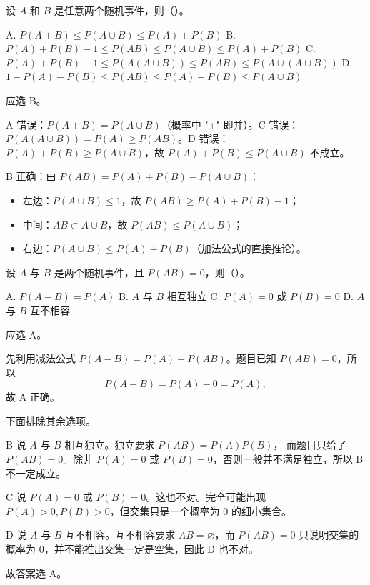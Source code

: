 ﻿\documentclass[lang=cn,11pt]{elegantbook}
\begin{document}
\begin{exercise}\label{exer:1-47}
设 \(A\) 和 \(B\) 是任意两个随机事件，则（\quad）。\par
A. \(P(A+B)\le P(A\cup B)\le P(A)+P(B)\)\quad
B. \(P(A)+P(B)-1\le P(AB)\le P(A\cup B)\le P(A)+P(B)\)\quad
C. \(P(A)+P(B)-1\le P(A(A\cup B))\le P(AB)\le P(A\cup(A\cup B))\)\quad
D. \(1-P(A)-P(B)\le P(AB)\le P(A)+P(B)\le P(A\cup B)\)
\end{exercise}

\begin{solution}
应选 B。

A 错误：\(P(A+B)=P(A\cup B)\)（概率中 "+" 即并）。C 错误：\(P(A(A\cup B))=P(A)\ge P(AB)\)。D 错误：\(P(A)+P(B)\ge P(A\cup B)\)，故 \(P(A)+P(B)\le P(A\cup B)\) 不成立。

B 正确：由 \(P(AB)=P(A)+P(B)-P(A\cup B)\)：
\begin{itemize}
    \item 左边：\(P(A\cup B)\le 1\)，故 \(P(AB)\ge P(A)+P(B)-1\)；
    \item 中间：\(AB\subset A\cup B\)，故 \(P(AB)\le P(A\cup B)\)；
    \item 右边：\(P(A\cup B)\le P(A)+P(B)\)（加法公式的直接推论）。
\end{itemize}
\end{solution}

\begin{exercise}\label{exer:1-48}
设 \(A\) 与 \(B\) 是两个随机事件，且 \(P(AB)=0\)，则（\quad）。\par
A. \(P(A-B)=P(A)\)\quad
B. \(A\) 与 \(B\) 相互独立\quad
C. \(P(A)=0\) 或 \(P(B)=0\)\quad
D. \(A\) 与 \(B\) 互不相容
\end{exercise}

\begin{solution}
应选 A。

先利用减法公式 \(P(A-B)=P(A)-P(AB)\)。题目已知 \(P(AB)=0\)，所以
\[
P(A-B)=P(A)-0=P(A),
\]
故 A 正确。

下面排除其余选项。

B 说 \(A\) 与 \(B\) 相互独立。独立要求 \(P(AB)=P(A)P(B)\)，
而题目只给了 \(P(AB)=0\)。除非 \(P(A)=0\) 或 \(P(B)=0\)，否则一般并不满足独立，所以 B 不一定成立。

C 说 \(P(A)=0\) 或 \(P(B)=0\)。这也不对。完全可能出现 \(P(A)>0,P(B)>0\)，但交集只是一个概率为 0 的细小集合。

D 说 \(A\) 与 \(B\) 互不相容。互不相容要求 \(AB=\varnothing\)，而 \(P(AB)=0\) 只说明交集的概率为 0，并不能推出交集一定是空集，因此 D 也不对。

故答案选 A。
\end{solution}
\end{document}
